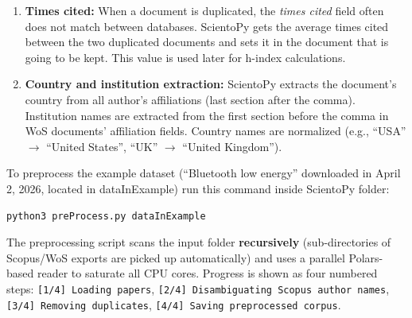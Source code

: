 \documentclass[10pt,letterpaper]{article}
\begin{document}
\begin{enumerate}
\item \textbf{Times cited:} When a document is duplicated, the \textit{times cited} field often does not match between databases. ScientoPy gets the average times cited between the two duplicated documents and sets it in the document that is going to be kept. This value is used later for h-index calculations.

\item \textbf{Country and institution extraction:} ScientoPy extracts the document's country from all author's affiliations (last section after the comma). Institution names are extracted from the first section before the comma in WoS documents' affiliation fields. Country names are normalized (e.g., ``USA'' $\to$ ``United States'', ``UK'' $\to$ ``United Kingdom'').
\end{enumerate}

To preprocess the example dataset (``Bluetooth low energy'' downloaded in April 2, 2026, located in dataInExample) run this command inside ScientoPy folder:
\begin{verbatim}
python3 preProcess.py dataInExample
\end{verbatim}

\noindent The preprocessing script scans the input folder \textbf{recursively} (sub-directories of Scopus/WoS exports are picked up automatically) and uses a parallel Polars-based reader to saturate all CPU cores. Progress is shown as four numbered steps: \verb|[1/4] Loading papers|, \verb|[2/4] Disambiguating Scopus author names|, \verb|[3/4] Removing duplicates|, \verb|[4/4] Saving preprocessed corpus|.
\end{document}
